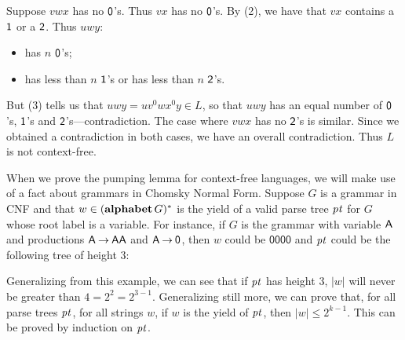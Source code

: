 Suppose $vwx$ has no $\mathsf{0}$'s.  Thus $vx$ has no $\mathsf{0}$'s.
By (2), we have that $vx$ contains a $\mathsf{1}$ or a $\mathsf{2}$.
Thus $uwy$:
\begin{itemize}
\item has $n$ $\mathsf{0}$'s;

\item has less than $n$ $\mathsf{1}$'s or has less than $n$ $\mathsf{2}$'s.
\end{itemize}
But (3) tells us that $uwy=uv^0wx^0y\in L$, so that $uwy$ has an equal
number of $\mathsf{0}$'s, $\mathsf{1}$'s and $\mathsf{2}$'s---contradiction.
The case where $vwx$ has no $\mathsf{2}$'s is similar.
Since we obtained a contradiction in both cases, we have an overall
contradiction.  Thus $L$ is not context-free.

When we prove the pumping lemma for context-free languages, we will
make use of a fact about grammars in Chomsky Normal Form.
Suppose $G$ is a grammar in CNF and that $w\in(\mathbf{alphabet}\,G)^*$
is the yield of a valid parse tree ${\it pt}$ for $G$ whose root label
is a variable.
For instance, if $G$ is the grammar with variable $\mathsf{A}$ and
productions $\mathsf{A}\mathbin{\to}\mathsf{A}\mathsf{A}$ and $\mathsf{A}\mathbin{\to}\mathsf{0}$, then
$w$ could be $\mathsf{0000}$ and ${\it pt}$ could be the following
tree of height $3$:
\begin{center}

\end{center}

Generalizing from this example, we can see that if ${\it pt}$ has height
$3$, $|w|$ will never be greater than $4=2^2=2^{3-1}$.  Generalizing
still more, we can prove that, for all parse trees ${\it pt}$, for all
strings $w$, if $w$ is the yield of ${\it pt}$, then $|w|\leq { 2^{k-1}}$.
This can be proved by induction on ${\it pt}$.

